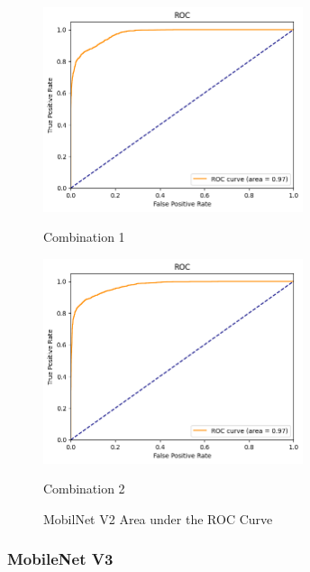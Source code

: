 \begin{figure}[H]
    \centering
    \begin{minipage}[b]{0.49\textwidth}
        \centering
        \includegraphics[width=\textwidth, height=6cm]{Figures/balanced_data/more_data/withoutbn/mn2/roc.png}
        \captionsetup{labelformat=empty}
        \caption{Combination 1}
        \label{fig:u_wo_r_roc}
    \end{minipage}
    \hfill
    \begin{minipage}[b]{0.49\textwidth}
        \centering
        \includegraphics[width=\textwidth, height=6cm]{Figures/balanced_data/more_data/withbn/mn2/roc.png}
        \captionsetup{labelformat=empty}
        \caption{Combination 2}
        \label{fig:u_w_r_roc}
    \end{minipage}
    \captionsetup{labelformat=default}
    \caption{MobilNet V2 Area under the ROC Curve}
\end{figure}

\subsubsection{MobileNet V3}

